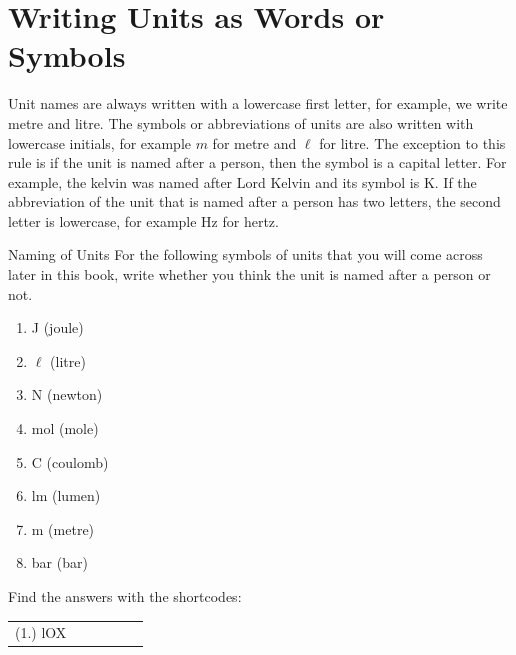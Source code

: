    \section{Writing Units as Words or Symbols}
            \nopagebreak
      \label{m30853*id62947}Unit names are always written with a lowercase first letter, for
example, we write metre and litre. The symbols or
abbreviations of units are also written with lowercase initials,
for example $m$ for metre and $\ell $ for litre. The exception to
this rule is if the unit is named after a person, then the
symbol is a capital letter. For example, the kelvin was named
after Lord Kelvin and its symbol is K. If the abbreviation of the unit that is named after a person has two letters, the second letter is lowercase, for example Hz for hertz.\par 
\label{m30853*secfhsst!!!underscore!!!id205}
\begin{exercises}{Naming of Units }
            \nopagebreak
      \label{m30853*id62978}For the following symbols of units that you will come across later
in this book, write whether you think the unit is named after a
person or not.\par 
      \label{m30853*id62985}\begin{enumerate}[noitemsep, label=\textbf{\arabic*}. ] 
            \label{m30853*uid7}\item J (joule)
\label{m30853*uid8}\item $\ell $ (litre)
\label{m30853*uid9}\item N (newton)
\label{m30853*uid10}\item mol (mole)
\label{m30853*uid11}\item C (coulomb)
\label{m30853*uid12}\item lm (lumen)
\label{m30853*uid13}\item m (metre)
\label{m30853*uid14}\item bar (bar)
\end{enumerate}
        \label{m30853*eip-463}        \par 
\par {} Find the answers with the shortcodes:
 \par \begin{tabular}[h]{cccccc}
 (1.) lOX  & \end{tabular}
\end{exercises}
